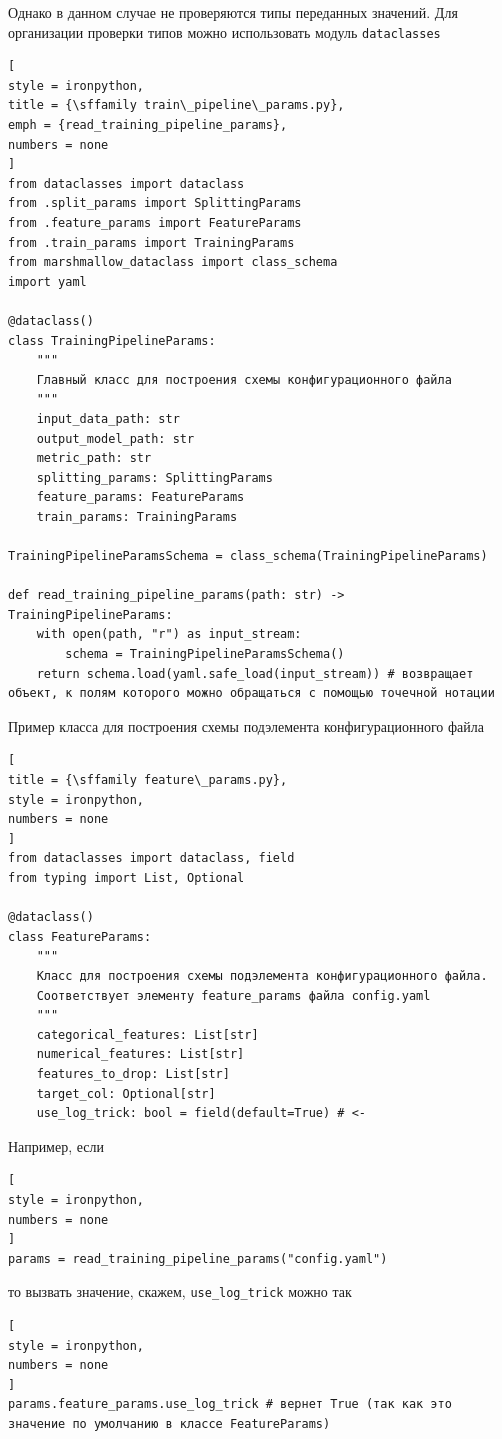 \documentclass[%
	11pt,
	a4paper,
	utf8,
		]{article}
\begin{document}
Однако в данном случае не проверяются типы переданных значений. Для организации проверки типов можно использовать модуль \texttt{dataclasses}
\begin{lstlisting}[
style = ironpython,
title = {\sffamily train\_pipeline\_params.py},
emph = {read_training_pipeline_params},
numbers = none	
]
from dataclasses import dataclass
from .split_params import SplittingParams
from .feature_params import FeatureParams
from .train_params import TrainingParams
from marshmallow_dataclass import class_schema
import yaml

@dataclass()
class TrainingPipelineParams:
    """
    Главный класс для построения схемы конфигурационного файла
    """
    input_data_path: str
    output_model_path: str
    metric_path: str
    splitting_params: SplittingParams
    feature_params: FeatureParams
    train_params: TrainingParams

TrainingPipelineParamsSchema = class_schema(TrainingPipelineParams)

def read_training_pipeline_params(path: str) -> TrainingPipelineParams:
    with open(path, "r") as input_stream:
        schema = TrainingPipelineParamsSchema()
    return schema.load(yaml.safe_load(input_stream)) # возвращает объект, к полям которого можно обращаться с помощью точечной нотации
\end{lstlisting}

Пример класса для построения схемы подэлемента конфигурационного файла
\begin{lstlisting}[
title = {\sffamily feature\_params.py},
style = ironpython,
numbers = none
]
from dataclasses import dataclass, field
from typing import List, Optional

@dataclass()
class FeatureParams:
    """
    Класс для построения схемы подэлемента конфигурационного файла.
    Соответствует элементу feature_params файла config.yaml
    """
    categorical_features: List[str]
    numerical_features: List[str]
    features_to_drop: List[str]
    target_col: Optional[str]
    use_log_trick: bool = field(default=True) # <- 
\end{lstlisting}

Например, если
\begin{lstlisting}[
style = ironpython,
numbers = none	
]
params = read_training_pipeline_params("config.yaml")
\end{lstlisting}
то вызвать значение, скажем, \texttt{use\_log\_trick} можно так
\begin{lstlisting}[
style = ironpython,
numbers = none	
]
params.feature_params.use_log_trick # вернет True (так как это значение по умолчанию в классе FeatureParams)
\end{lstlisting}
\end{document}
